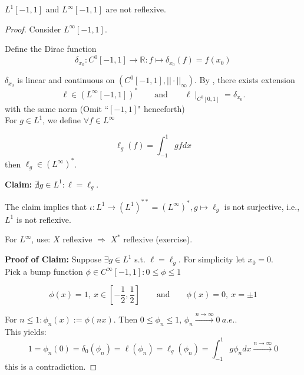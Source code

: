 \documentclass{article}
\begin{document}
\begin{proposition}
\label{non-reflexive space}
    $L^1[-1,1]$ and $L^{\infty}[-1,1]$ are not reflexive.
\end{proposition}
\begin{proof}
Consider $L^\infty[-1,1]$. 

Define the Dirac function 
$$\delta_{x_0}: C^0[-1,1] \rightarrow \mathbb{R}: f \mapsto \delta_{x_0}(f) = f(x_0)$$

$\delta_{x_0}$ is linear and continuous on $(C^0[-1,1],||\cdot ||_\infty)$. By , there exists extension 
$$\ell\in (L^\infty [-1,1])^* \qquad \text{and} \qquad \ell\mid_{C^0[0,1]} = \delta_{x_0}.$$
with the same norm (Omit \textquotedblleft $[-1,1]$" henceforth) \\

For $g\in L^1$, we define $\forall f\in L^\infty$

$$\ell_g(f) = \int_{-1}^1 gf dx$$
then $\ell_g\in (L^\infty)^*$.


\textbf{Claim:} $\nexists g\in L^1: \ell=\ell_g$.  

The claim implies that $\iota: L^1 \rightarrow (L^1)^{**}=(L^\infty)^*, g \mapsto \ell_g$ is not surjective, i.e., $L^1$ is not reflexive.  

For $L^\infty$, use: $X$ reflexive $\Rightarrow$ $X^*$ reflexive (exercise).  

\textbf{Proof of Claim:} Suppose $\exists g\in L^1$ s.t. $\ell=\ell_g$. For simplicity let $x_0=0$.\\
Pick a bump function $\phi \in C^\infty [-1,1]: 0 \leq \phi \leq 1$

$$
\phi(x) = 1, \ x \in [-\frac{1}{2}, \frac{1}{2}] \qquad \text{and} \qquad \phi(x)=0, \ x=\pm 1
$$

For $n\leq 1: \phi_n(x) := \phi(nx)$. Then $0\leq \phi_n \leq 1$, $\phi_n \overset{n\to \infty}{\longrightarrow} 0 \ a.e.$.\\
This yields: $$1 = \phi_n(0)=\delta_{0}(\phi_n) = \ell(\phi_n) = \ell_g(\phi_n) = \int_{-1}^1 g\phi_n dx \overset{n\to \infty}{\longrightarrow} 0$$
this is a contradiction.
\end{proof}
\end{document}
